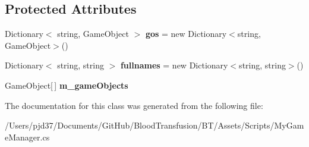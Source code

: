 \subsection*{Protected Attributes}
\begin{DoxyCompactItemize}
\item 
Dictionary$<$ string, Game\+Object $>$ {\bfseries gos} = new Dictionary$<$string, Game\+Object$>$()\hypertarget{class_my_game_manager_a154bf626f60865000c564e5331345657}{}\label{class_my_game_manager_a154bf626f60865000c564e5331345657}

\item 
Dictionary$<$ string, string $>$ {\bfseries fullnames} = new Dictionary$<$string, string$>$()\hypertarget{class_my_game_manager_a1057fb22c94efd57e55c2e9f1a6ad84f}{}\label{class_my_game_manager_a1057fb22c94efd57e55c2e9f1a6ad84f}

\item 
Game\+Object\mbox{[}$\,$\mbox{]} {\bfseries m\+\_\+game\+Objects}\hypertarget{class_my_game_manager_a94d7dc8efae4fa62bcb1bfaff0a21c2e}{}\label{class_my_game_manager_a94d7dc8efae4fa62bcb1bfaff0a21c2e}

\end{DoxyCompactItemize}


The documentation for this class was generated from the following file\+:\begin{DoxyCompactItemize}
\item 
/\+Users/pjd37/\+Documents/\+Git\+Hub/\+Blood\+Transfusion/\+B\+T/\+Assets/\+Scripts/My\+Game\+Manager.\+cs\end{DoxyCompactItemize}
